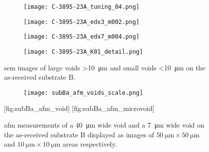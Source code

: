 \begin{figure}[htbp]
    \centering
    \begin{subfigure}[t]{\textwidth}
    \caption{}\label{fig:subBa_voids}
          \begin{minipage}[c]{0.49\linewidth}
            \centering
            \texttt{[image: C-3895-23A\_tuning\_04.png]}
          \end{minipage}
          \hfill
          \begin{minipage}[c]{0.49\linewidth}
            \centering
            \texttt{[image: C-3895-23A\_edx3\_m002.png]}
          \end{minipage}
    \end{subfigure}%
    \par\bigskip
    \begin{subfigure}[t]{\textwidth}
    \caption{}\label{fig:subBa_microvoids}
          \begin{minipage}[c]{0.49\linewidth}
            \centering
            \texttt{[image: C-3895-23A\_edx7\_m004.png]}
          \end{minipage}
          \hfill
          \begin{minipage}[c]{0.49\linewidth}
            \centering
            \texttt{[image: C-3895-23A\_K01\_detail.png]}
          \end{minipage}
    \end{subfigure}%
    \caption[\Ac{sem} images of voids on substrate B.]{\Ac{sem} images of  large voids \SI{>10}{\micro\metre} and  small voids \SI{<10}{\micro\metre} on the as-received substrate B.}
    \label{fig:SEM_C389523_voids}
\end{figure}

\begin{figure}
    \centering
    \begin{subfigure}[c]{0.032\linewidth}
        \label{fig:subBa_afm_voids_scale}\captionsetup{list=no}
        \texttt{[image: subBa\_afm\_voids\_scale.png]}
    \end{subfigure}
    \hfill
    [fig:subBa_afm_void]
    \hfill
    [fig:subBa_afm_microvoid]
    \caption[\Ac{afm} measurements of voids on as-received substrate B.]{\Ac{afm} measurements of  a \SI{40}{\micro\metre} wide void and  a \SI{7}{\micro\metre} wide void on the as-received substrate B displayed as images of $\SI{50}{\micro\metre}\times\SI{50}{\micro\metre}$ and $\SI{10}{\micro\metre}\times\SI{10}{\micro\metre}$ areas respectively.}
    \label{fig:subBa_afm_voids}
\end{figure}

